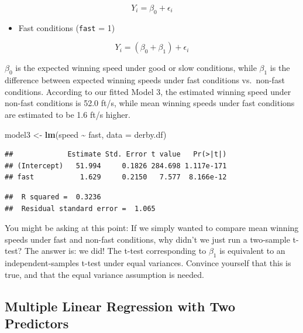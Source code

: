 \documentclass[
]{krantz}
\newenvironment{Shaded}{\begin{snugshade}}{\end{snugshade}}
\newcommand{\AttributeTok}[1]{\textcolor[rgb]{0.27,0.27,0.27}{#1}}
\newcommand{\FunctionTok}[1]{\textcolor[rgb]{0.27,0.27,0.27}{\textbf{#1}}}
\newcommand{\NormalTok}[1]{#1}
\newcommand{\OtherTok}[1]{\textcolor[rgb]{0.37,0.37,0.37}{#1}}
\newcommand{\SpecialCharTok}[1]{\textcolor[rgb]{0.43,0.43,0.43}{\textbf{#1}}}
\providecommand{\tightlist}{%
  \setlength{\itemsep}{0pt}\setlength{\parskip}{0pt}}
\begin{document}
\begin{equation*}
Y_{i} = \beta_{0}+\epsilon_{i}
\end{equation*}

\begin{itemize}
\tightlist
\item
  Fast conditions (\texttt{fast} = 1)
\end{itemize}

\begin{equation*}
Y_{i} = (\beta_{0}+\beta_{1})+\epsilon_{i}
\end{equation*}

\(\beta_{0}\) is the expected winning speed under good or slow conditions, while \(\beta_{1}\) is the difference between expected winning speeds under fast conditions vs.~non-fast conditions. According to our fitted Model 3, the estimated winning speed under non-fast conditions is 52.0 ft/s, while mean winning speeds under fast conditions are estimated to be 1.6 ft/s higher.

\begin{Shaded}
\begin{Highlighting}[]
\NormalTok{model3 }\OtherTok{\textless{}{-}} \FunctionTok{lm}\NormalTok{(speed }\SpecialCharTok{\textasciitilde{}}\NormalTok{ fast, }\AttributeTok{data =}\NormalTok{ derby.df)}
\end{Highlighting}
\end{Shaded}

\begin{verbatim}
##             Estimate Std. Error t value   Pr(>|t|)
## (Intercept)   51.994     0.1826 284.698 1.117e-171
## fast           1.629     0.2150   7.577  8.166e-12
\end{verbatim}

\begin{verbatim}
##  R squared =  0.3236 
##  Residual standard error =  1.065
\end{verbatim}

You might be asking at this point: If we simply wanted to compare mean winning speeds under fast and non-fast conditions, why didn't we just run a two-sample t-test? The answer is: we did! The t-test corresponding to \(\beta_{1}\) is equivalent to an independent-samples t-test under equal variances. Convince yourself that this is true, and that the equal variance assumption is needed.

\subsection{Multiple Linear Regression with Two Predictors}\label{multiple-linear-regression-with-two-predictors}
\end{document}
